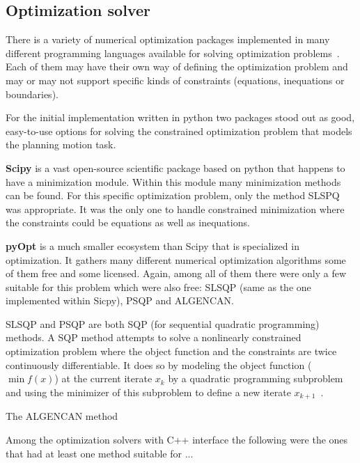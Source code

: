 \subsection{Optimization solver}


There is a variety of numerical optimization packages implemented in many different programming languages available for solving optimization problems~\cite{pyopt-paper}. Each of them may have their own way of defining the optimization problem and may or may not support specific kinds of constraints (equations, inequations or boundaries).

For the initial implementation written in python two packages stood out as good, easy-to-use options for solving the constrained optimization problem that models the planning motion task.

\textbf{Scipy} is a vast open-source scientific package based on python that happens to have a minimization module. Within this module many minimization methods can be found. For this specific optimization problem, only the method SLSPQ was appropriate. It was the only one to handle constrained minimization where the constraints could be equations as well as inequations.

\textbf{pyOpt} is a much smaller ecosystem than Scipy that is specialized in optimization. It gathers many different numerical optimization algorithms some of them free and some licensed. Again, among all of them there were only a few suitable for this problem which were also free: SLSQP (same as the one implemented within Sicpy), PSQP and ALGENCAN.

SLSQP and PSQP are both SQP (for sequential quadratic programming) methods. A SQP method attempts to solve a nonlinearly constrained optimization problem where the object function and the constraints are twice continuously differentiable. It does so by modeling the object function ($\min f(x)$) at the current iterate $x_k$ by a quadratic programming subproblem and using the minimizer of this subproblem to define a new iterate $x_{k+1}$~\cite{Nocedal}.

The ALGENCAN method

Among the optimization solvers with C++ interface the following were the ones that had at least one method suitable for ...

